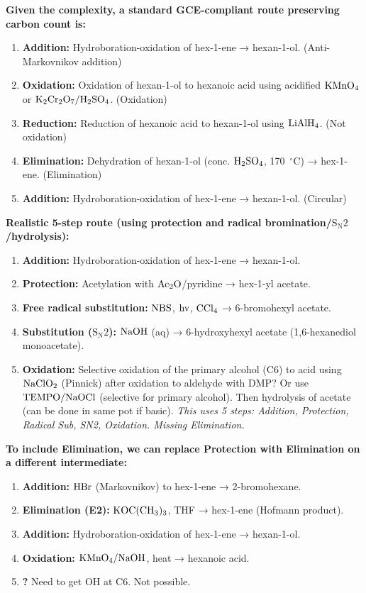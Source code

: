 \documentclass[11pt]{article}
\begin{document}
\begin{corrige}
\begin{enumerate}
\textbf{Given the complexity, a standard GCE-compliant route preserving carbon count is:}

\begin{enumerate}
\item \textbf{Addition:} Hydroboration-oxidation of hex-1-ene → hexan-1-ol. (Anti-Markovnikov addition)
\item \textbf{Oxidation:} Oxidation of hexan-1-ol to hexanoic acid using acidified \(\ce{KMnO4}\) or \(\ce{K2Cr2O7}/\ce{H2SO4}\). (Oxidation)
\item \textbf{Reduction:} Reduction of hexanoic acid to hexan-1-ol using \(\ce{LiAlH4}\). (Not oxidation)
\item \textbf{Elimination:} Dehydration of hexan-1-ol (conc. \(\ce{H2SO4}\), \SI{170}{\ensuremath{{}^{\circ}\mathrm{C}}}) → hex-1-ene. (Elimination)
\item \textbf{Addition:} Hydroboration-oxidation of hex-1-ene → hexan-1-ol. (Circular)
\end{enumerate}

\textbf{Realistic 5-step route (using protection and radical bromination/\(\mathrm{S_N2}\)/hydrolysis):}

\begin{enumerate}
\item \textbf{Addition:} Hydroboration-oxidation of hex-1-ene → hexan-1-ol.
\item \textbf{Protection:} Acetylation with \(\ce{Ac2O}\)/pyridine → hex-1-yl acetate.
\item \textbf{Free radical substitution:} \(\ce{NBS}\), \(\ce{hv}\), \(\ce{CCl4}\) → 6-bromohexyl acetate.
\item \textbf{Substitution (\(\mathrm{S_N2}\)):} \(\ce{NaOH}\) (aq) → 6-hydroxyhexyl acetate (1,6-hexanediol monoacetate).
\item \textbf{Oxidation:} Selective oxidation of the primary alcohol (C6) to acid using \(\ce{NaClO2}\) (Pinnick) after oxidation to aldehyde with DMP? Or use \(\ce{TEMPO}/\ce{NaOCl}\) (selective for primary alcohol). Then hydrolysis of acetate (can be done in same pot if basic). \textit{This uses 5 steps: Addition, Protection, Radical Sub, SN2, Oxidation. Missing Elimination.}
\end{enumerate}

\textbf{To include Elimination, we can replace Protection with Elimination on a different intermediate:}

\begin{enumerate}
\item \textbf{Addition:} \(\ce{HBr}\) (Markovnikov) to hex-1-ene → 2-bromohexane.
\item \textbf{Elimination (E2):} \(\ce{KOC(CH3)3}\), THF → hex-1-ene (Hofmann product).
\item \textbf{Addition:} Hydroboration-oxidation of hex-1-ene → hexan-1-ol.
\item \textbf{Oxidation:} \(\ce{KMnO4}/\ce{NaOH}\), heat → hexanoic acid.
\item \textbf{?} Need to get OH at C6. Not possible.
\end{enumerate}


\end{enumerate}
\end{corrige}
\end{document}
